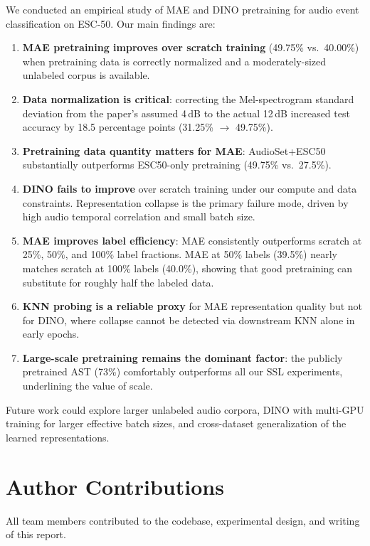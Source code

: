 \documentclass{article}
\begin{document}
We conducted an empirical study of MAE and DINO pretraining for audio event classification on ESC-50. Our main findings are:

\begin{enumerate}
    \item \textbf{MAE pretraining improves over scratch training} (49.75\% vs.\ 40.00\%) when pretraining data is correctly normalized and a moderately-sized unlabeled corpus is available.
    \item \textbf{Data normalization is critical}: correcting the Mel-spectrogram standard deviation from the paper's assumed 4\,dB to the actual 12\,dB increased test accuracy by 18.5 percentage points (31.25\% $\to$ 49.75\%).
    \item \textbf{Pretraining data quantity matters for MAE}: AudioSet+ESC50 substantially outperforms ESC50-only pretraining (49.75\% vs.\ 27.5\%).
    \item \textbf{DINO fails to improve} over scratch training under our compute and data constraints. Representation collapse is the primary failure mode, driven by high audio temporal correlation and small batch size.
    \item \textbf{MAE improves label efficiency}: MAE consistently outperforms scratch at 25\%, 50\%, and 100\% label fractions. MAE at 50\% labels (39.5\%) nearly matches scratch at 100\% labels (40.0\%), showing that good pretraining can substitute for roughly half the labeled data.
    \item \textbf{KNN probing is a reliable proxy} for MAE representation quality but not for DINO, where collapse cannot be detected via downstream KNN alone in early epochs.
    \item \textbf{Large-scale pretraining remains the dominant factor}: the publicly pretrained AST (73\%) comfortably outperforms all our SSL experiments, underlining the value of scale.
\end{enumerate}

Future work could explore larger unlabeled audio corpora, DINO with multi-GPU training for larger effective batch sizes, and cross-dataset generalization of the learned representations.

\section*{Author Contributions}

All team members contributed to the codebase, experimental design, and writing of this report.
\end{document}
